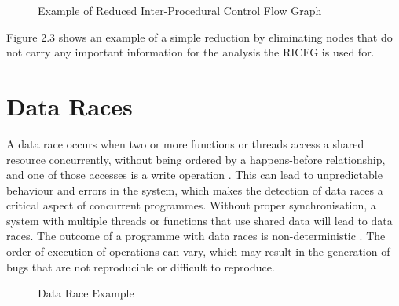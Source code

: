 \documentclass[
fancyheadings, %
%
%
]{stsreprt}
\begin{document}
{\begin{figure}[H]
			\caption{Example of Reduced Inter-Procedural Control Flow Graph}
		\end{figure}
		
		Figure 2.3 shows an example of a simple reduction by eliminating nodes that do not carry any important information for the analysis the RICFG is used for. 
		
		\section{Data Races}
		
		A data race occurs when two or more functions or threads access a shared resource concurrently, without being ordered by a happens-before relationship, and one of those accesses is a write operation \cite{chen2011}. This can lead to unpredictable behaviour and errors in the system, which makes the detection of data races a critical aspect of concurrent programmes.
		Without proper synchronisation, a system with multiple threads or functions that use shared data will lead to data races. The outcome of a programme with data races is non-deterministic \cite{chen2011}. The order of execution of operations can vary, which may result in the generation of bugs that are not reproducible or difficult to reproduce. 
		\begin{figure}[H]
			\centering
			\begin{algorithm}[H]
				\caption{Data Race Example}
				

\end{algorithm}
\end{figure}}
\end{document}
